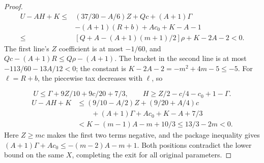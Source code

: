 \documentclass[11pt,a4paper]{article}
\theoremstyle{definition}
\begin{document}
\begin{proof}
\[
\begin{split}
U-AH+K\le{}&
(37/30-A/6)Z+Qc+(A+1)\Gamma\\
&-(A+1)(R+b)+Ac_0+K-A-1\\
\le{}&[Q+A-(A+1)(m+1)/2]\rho+K-2A-2<0.
\end{split}
\]
The first line's $Z$ coefficient is at most $-1/60$, and
$Qc-(A+1)R\le Q\rho-(A+1)$.
The bracket in the second line is at most $-113/60-13A/12<0$;
the constant is $K-2A-2=-m^2+4m-5\le-5$.
For $\ell=R+b$, the piecewise tax decreases with $\ell$, so

\[
U\le\Gamma+9Z/10+9c/20+7/3,\qquad
H\ge Z/2-c/4-c_0+1-\Gamma.
\]
\[
\begin{split}
U-AH+K
&\le(9/10-A/2)Z+(9/20+A/4)c\\
&\qquad +(A+1)\Gamma+Ac_0+K-A+7/3\\
&<K-(m-1)A-m+10/3
\le13/3-2m<0.
\end{split}
\]
Here $Z\ge mc$ makes the first two terms negative, and the package inequality gives
$(A+1)\Gamma+Ac_0\le-(m-2)A-m+1$.
Both positions contradict the lower bound on the same $X$, completing the exit
for all original parameters.
\end{proof}
\end{document}
